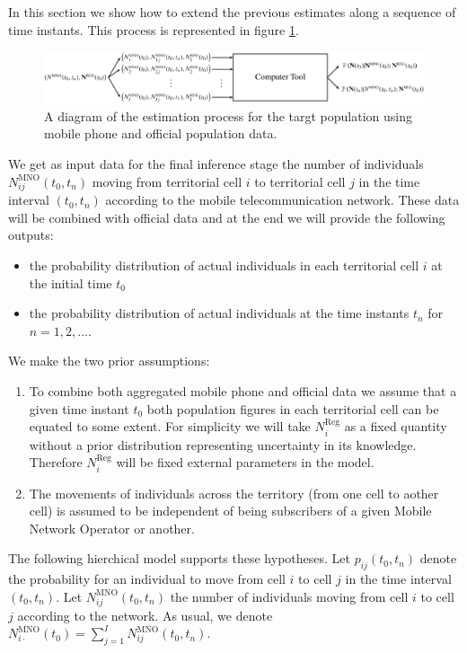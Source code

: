 \documentclass[12pt, a4paper]{article}
\begin{document}
In this section we show how to extend the previous estimates along a sequence of time instants. This process is represented in figure  \ref{Tool2}.

\begin{figure}[htbp]
	\centering
	\includegraphics[scale=0.35]{Tool2.png}
	\caption{A diagram of the estimation process for the targt population using mobile phone and official population data.}
	\label{Tool2} 
\end{figure}


We get as input data for the final inference stage the number of individuals $N_{ij}^{\textrm{MNO}}(t_{0}, t_{n})$ moving from territorial cell $i$ to territorial cell $j$ in the time interval $(t_{0}, t_{n})$ according to the mobile telecommunication network. These data will be combined with official data and at the end we will  provide the following outputs:

\begin{itemize}
	\item the probability distribution of actual individuals in each territorial cell $i$ at the initial time $t_{0}$
	\item the probability distribution of actual individuals at the time instants $t_{n}$ for $n=1,2,\dots$.
\end{itemize}  

We make the two prior assumptions:

\begin{enumerate}
	\item To combine both aggregated mobile phone and official data we assume that a given time instant $t_{0}$ both population figures in each territorial cell can be equated to some extent. For simplicity we will take $N_{i}^{\textrm{Reg}}$ as a fixed quantity without a prior distribution representing uncertainty in its knowledge. Therefore $N_{i}^{\textrm{Reg}}$ will be fixed external parameters in the model. 
	\item The movements of individuals across the territory (from one cell to aother cell) is assumed to be independent of being subscribers of a given Mobile Network Operator or another.
\end{enumerate}

The following hierchical model supports these hypotheses. Let $p_{ij}(t_{0}, t_{n})$ denote the probability for an individual to move from cell $i$ to cell $j$ in the time interval $(t_{0}, t_{n})$. Let $N_{ij}^{\textrm{MNO}}(t_{0}, t_{n})$ the number of individuals moving from cell $i$ to cell $j$ according to the network. As usual, we denote $N_{i\cdot}^{\textrm{MNO}}(t_{0})=\sum_{j=1}^{I}N_{ij}^{\textrm{MNO}}(t_{0}, t_{n})$. 
\end{document}
